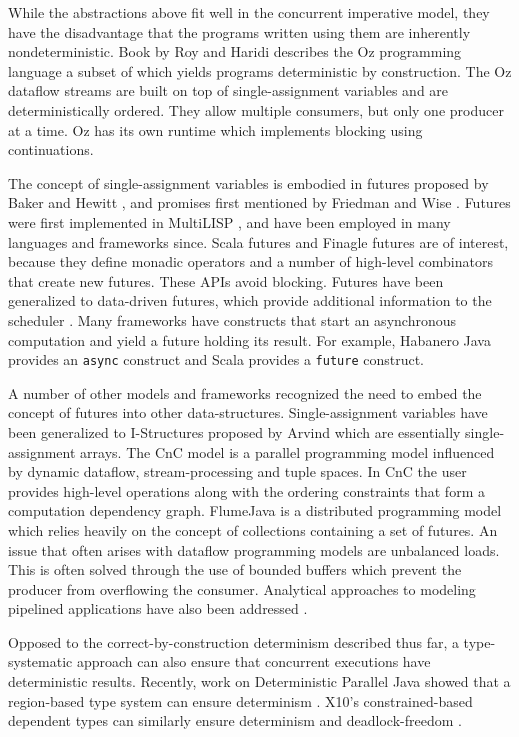\documentclass[runningheads,a4paper]{llncs}
\begin{document}
While the abstractions above fit well in the concurrent imperative
model, they have the disadvantage that the programs written using them
are inherently nondeterministic.
Book by Roy and Haridi \cite{RoyH2004} describes the Oz programming language 
a subset of which yields programs deterministic by construction.
The Oz dataflow streams are built on top of
single-assignment variables and are deterministically ordered.
They allow multiple consumers, but only one producer
at a time.
Oz has its own runtime which implements blocking using
continuations.

The concept of single-assignment variables is embodied in
futures proposed by Baker and Hewitt \cite{Hewitt77}, and promises
first mentioned by Friedman and Wise \cite{Wise76}.
Futures were first implemented in MultiLISP \cite{Halstead85},
and have been employed in many languages and frameworks since.
Scala futures \cite{TODO} and Finagle futures \cite{TODO} are
of interest, because they define monadic operators and a
number of high-level combinators that create new futures.
These APIs avoid blocking.
Futures have been generalized to data-driven futures,
which provide additional information to the scheduler
\cite{Tasirlar11}.
Many frameworks have constructs that start an asynchronous
computation and yield a future holding its result.
For example, Habanero Java \cite{Shirako11} provides an \verb=async=
construct and Scala provides a \verb=future= construct.

A number of other models and frameworks recognized the need to embed
the concept of futures into other data-structures.
Single-assignment variables have been generalized to I-Structures
proposed by Arvind \cite{Arvind89} which are essentially
single-assignment arrays.
The CnC model \cite{Burke11} \cite{CnC10} is a parallel programming model
influenced by dynamic dataflow, stream-processing and tuple spaces.
In CnC the user provides high-level operations along with the ordering
constraints that form a computation dependency graph.
FlumeJava \cite{Chambers10} is a distributed programming model which
relies heavily on the concept of collections containing a set of
futures.
An issue that often arises with dataflow programming models are
unbalanced loads.
This is often solved through the use of bounded buffers which prevent
the producer from overflowing the consumer.
Analytical approaches to modeling pipelined applications have also
been addressed \cite{Cascaval09}.

Opposed to the correct-by-construction determinism described thus far,
a type-systematic approach can also ensure that concurrent executions
have deterministic results.
Recently, work on Deterministic Parallel Java showed that a
region-based type system can ensure determinism \cite{Bocchino09}.
X10's constrained-based dependent types can similarly ensure
determinism and deadlock-freedom \cite{Saraswat07}.
\end{document}
